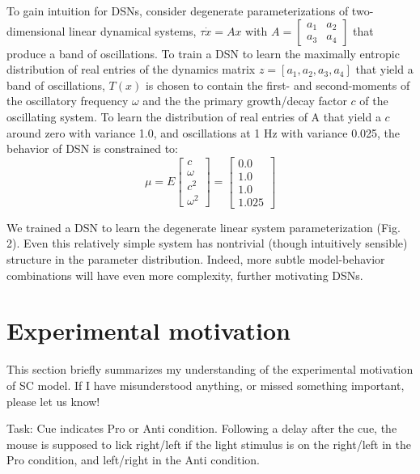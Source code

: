 \documentclass[11pt]{article}
\begin{document}
To gain intuition for DSNs, consider degenerate parameterizations of two-dimensional linear dynamical systems, $\tau \dot{x} = Ax$ with $A = \begin{bmatrix} a_1 & a_2 \\ a_3 & a_4 \end{bmatrix}$ that produce a band of oscillations. To train a DSN to learn the maximally entropic distribution of real entries of the dynamics matrix $z = \left[a_1, a_2, a_3, a_4 \right]$ that yield a band of oscillations, $T(x)$ is chosen to contain the first- and second-moments of the oscillatory frequency $\omega$ and the the primary growth/decay factor $c$ of the oscillating system.  To learn the distribution of real entries of A that yield a $c$ around zero with variance 1.0, and oscillations at 1 Hz with variance 0.025, the behavior of DSN is constrained to:
\begin{equation}
 \mu = E \begin{bmatrix} c \\ \omega \\ c^2 \\ \omega^2 \end{bmatrix} = \begin{bmatrix} 0.0 \\ 1.0 \\ 1.0 \\ 1.025 \end{bmatrix}
 \end{equation} 

We trained a DSN to learn the degenerate linear system parameterization (Fig. 2). Even this relatively simple system has nontrivial (though intuitively sensible) structure in the parameter distribution.  Indeed, more subtle model-behavior combinations will have even more complexity, further motivating DSNs. \\

\section{Experimental motivation}
This section briefly summarizes my understanding of the experimental motivation of SC model.  If I have misunderstood anything, or missed something important, please let us know!

Task: Cue indicates Pro or Anti condition.  Following a delay after the cue, the mouse is supposed to lick right/left if the light stimulus is on the right/left in the Pro condition, and left/right in the Anti condition.  
\end{document}
